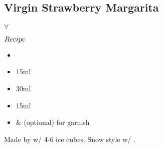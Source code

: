 \subsection{Virgin Strawberry Margarita}
\vspace{-8.mm}
\hspace{72mm}
$\forall$
\vspace{2.5mm}
\begin{itembox}[l]{\boldmath $Recipe$}
\begin{itemize}
\setlength{\parskip}{0cm}
\setlength{\itemsep}{0cm}
\item {}
\item \limj 15ml
\item \oj 30ml
\item \gumsyrup 15ml
\item \strawberry \& \lime (optional) for garnish
\end{itemize}
\vspace{-4mm}
Made by \blend w/ 4-6 ice cubes. Snow style w/ \sugar
\hspace{-1mm}.
\end{itembox}

